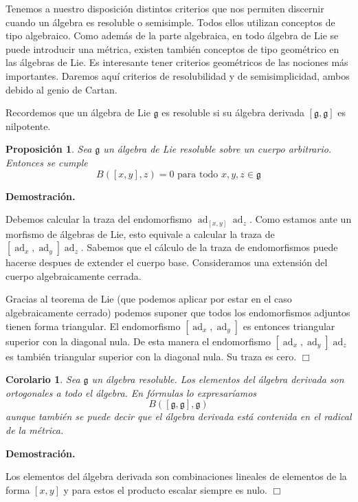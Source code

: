 \documentclass[a4paper,draft,12pt]{article}
\newtheorem{propo}[teo]{Proposición}%
\newtheorem{cor}[teo]{Corolario}%
\newcommand{\dem}{\noindent \textbf{Demostración. }\vspace{0.3 cm}}%
\newcommand{\g}{\mathfrak{g}}%
\newcommand{\fin}{ $\Box $ \vspace{0.4 cm}}
\DeclareMathOperator{\ad}{ad}  %
\begin{document}
 Tenemos a nuestro disposición distintos criterios que nos permiten discernir cuando un álgebra es resoluble o semisimple.  Todos ellos utilizan conceptos de tipo algebraico.  Como además de la parte algebraica, en todo álgebra de Lie se puede introducir una métrica, existen también conceptos de tipo geométrico en las álgebras de Lie.  Es interesante tener criterios geométricos de las nociones más importantes.  Daremos aquí criterios de resolubilidad y de semisimplicidad, ambos debido al genio de Cartan.
 
 Recordemos que un álgebra de Lie $\g$ es resoluble si su álgebra derivada $[\g,\g]$ es nilpotente.
 
 \begin{propo}
 
 Sea $\g$ un álgebra de Lie resoluble sobre un cuerpo arbitrario.  Entonces se cumple
 $$
 B([x,y],z)=0 \text{ para todo } x,y,z \in \g
 $$
 
 \end{propo}
 
 \dem
 
 Debemos calcular la traza del endomorfismo $\ad_{[x,y]}\ad_z$.  Como estamos ante un morfismo de álgebras de Lie, esto equivale a calcular la traza de $[\ad_x,\ad_y]\ad_z$.  Sabemos que el cálculo de la traza de endomorfismos puede hacerse despues de extender el cuerpo base.  Consideramos una extensión del cuerpo algebraicamente cerrada.
 
 Gracias al teorema de Lie (que podemos aplicar por estar en el caso algebraicamente cerrado) podemos suponer que todos los endomorfismos adjuntos tienen forma triangular.  El endomorfismo $[\ad_x,\ad_y]$ es entonces triangular superior con la diagonal nula.  De esta manera el endomorfismo
 $[\ad_x,\ad_y]\ad_z$ es también triangular superior con la diagonal nula.  Su traza es cero.  \fin
 
 \begin{cor}
 
 Sea $\g$ un álgebra resoluble. 
 Los elementos del álgebra derivada son ortogonales a todo el álgebra.  En fórmulas lo expresaríamos
 $$
 B([\g,\g], \g)
 $$
 aunque también se puede decir que el álgebra derivada está contenida en el radical de la métrica.
 
 
 \end{cor}
 
  \dem
 
 
 Los elementos del álgebra derivada son combinaciones lineales de elementos de la forma $[x,y]$ y para estos el producto escalar siempre es nulo.  \fin
 
\end{document}
